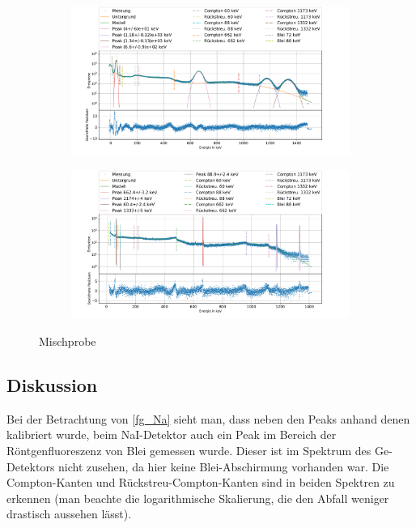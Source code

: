 \documentclass[
	a4paper,
	12pt,
	pagesize,
	ngerman
]{scrartcl}
\begin{document}
\begin{figure}[H]
		\centering
		\begin{subfigure}[c]{\textwidth}
			\centering
			\includegraphics[width= 1 \linewidth]{img/MixNa.pdf}
		\label{fg_Mix_Na}
		\end{subfigure}
		\begin{subfigure}[c]{\textwidth}
			\centering
			\includegraphics[width= 1 \linewidth]{img/MixGe.pdf}
		\label{fg_Mix_Ge}
		\end{subfigure}
		\caption{Mischprobe}
		\label{fg_Mix}
	\end{figure}

\subsection{Diskussion}

Bei der Betrachtung von \cref{fg_Na} sieht man, dass neben den Peaks anhand denen kalibriert wurde, beim NaI-Detektor auch ein Peak im Bereich der Röntgenfluoreszenz von Blei gemessen wurde.
Dieser ist im Spektrum des Ge-Detektors nicht zusehen, da hier keine Blei-Abschirmung vorhanden war.
Die Compton-Kanten und Rückstreu-Compton-Kanten sind in beiden Spektren zu erkennen (man beachte die logarithmische Skalierung, die den Abfall weniger drastisch aussehen lässt).
\end{document}
